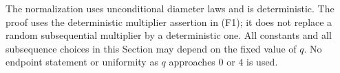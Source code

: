 The normalization uses unconditional diameter laws and is deterministic.
The proof uses the deterministic multiplier assertion in (F1); it does
not replace a random subsequential multiplier by a deterministic one.
All constants and all subsequence choices in this Section may depend
on the fixed value of \(q\). No endpoint statement or uniformity as
\(q\) approaches \(0\) or \(4\) is used.
